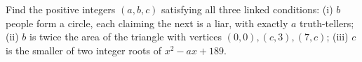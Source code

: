 Find the positive integers $(a,b,c)$ satisfying all three linked conditions: (i) $b$ people form a circle, each claiming the next is a liar, with exactly $a$ truth-tellers; (ii) $b$ is twice the area of the triangle with vertices $(0,0),(c,3),(7,c)$; (iii) $c$ is the smaller of two integer roots of $x^2-ax+189$.
